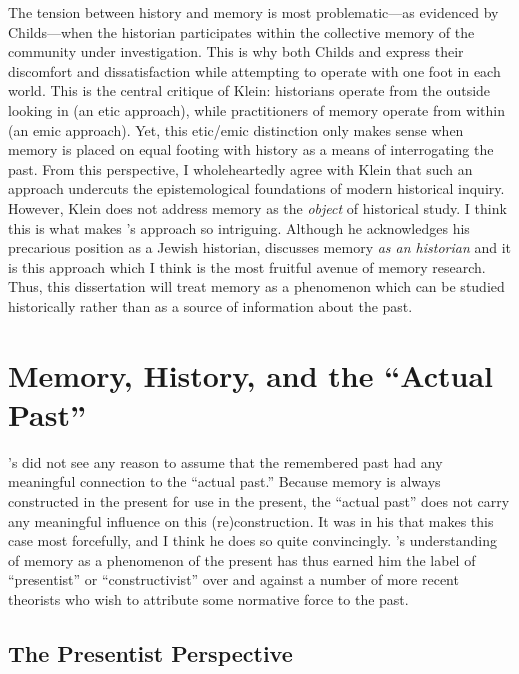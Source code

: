 The tension between history and memory is most problematic---as evidenced by Childs---when the historian participates within the collective memory of the community under investigation. This is why both Childs and \yerushalmi express their discomfort and dissatisfaction while attempting to operate with one foot in each world. This is the central critique of Klein: historians operate from the outside looking in (an etic approach), while practitioners of memory operate from within (an emic approach). Yet, this etic/emic distinction only makes sense when memory is placed on equal footing with history as a means of interrogating the past. From this perspective, I wholeheartedly agree with Klein that such an approach undercuts the epistemological foundations of modern historical inquiry. However, Klein does not address memory as the \emph{object} of historical study. I think this is what makes \yerushalmi's approach so intriguing. Although he acknowledges his precarious position as a Jewish historian, \yerushalmi discusses memory \emph{as an historian} and it is this approach which I think is the most fruitful avenue of memory research. Thus, this dissertation will treat memory as a phenomenon which can be studied historically rather than as a source of information about the past.

\section{Memory, History, and the ``Actual Past''}

\halbwachs's did not see any reason to assume that the remembered past had any meaningful connection to the ``actual past.'' Because memory is always constructed in the present for use in the present, the ``actual past'' does not carry any meaningful influence on this (re)construction. It was in his  that \halbwachs makes this case most forcefully, and I think he does so quite convincingly. \halbwachs's understanding of memory as a phenomenon of the present has thus earned him the label of ``presentist'' or ``constructivist'' over and against a number of more recent theorists who wish to attribute some normative force to the past.\autocite[27--30]{coser_halbwachs1992}  

\hypertarget{the-presentist-perspective}{%
\subsection{The Presentist Perspective}\label{the-presentist-perspective}}  

